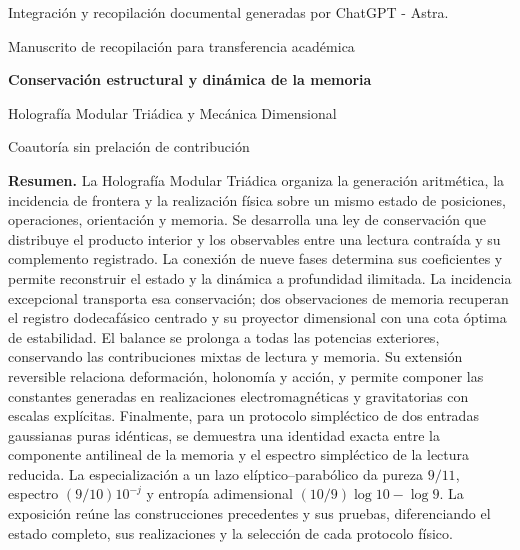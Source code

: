 \thispagestyle{plain}
\begin{center}
{\fontsize{8}{10}\selectfont Integración y recopilación documental generadas por ChatGPT - Astra.\par}
{\fontsize{9}{11}\selectfont Manuscrito de recopilación para transferencia académica\par}
\vspace{6mm}
{\fontsize{20}{24}\selectfont\bfseries Conservación estructural y dinámica de la memoria\par}
\vspace{3mm}
{\fontsize{12}{15}\selectfont Holografía Modular Triádica y Mecánica Dimensional\par}
\vspace{5mm}
{\fontsize{10}{12}\selectfont\Autores\par}
{\fontsize{8}{10}\selectfont Coautoría sin prelación de contribución\par}
\end{center}
\vspace{4mm}
\noindent\textbf{Resumen.}
La Holografía Modular Triádica organiza la generación aritmética, la incidencia de frontera y la realización física sobre un mismo estado de posiciones, operaciones, orientación y memoria. Se desarrolla una ley de conservación que distribuye el producto interior y los observables entre una lectura contraída y su complemento registrado. La conexión de nueve fases determina sus coeficientes y permite reconstruir el estado y la dinámica a profundidad ilimitada. La incidencia excepcional transporta esa conservación; dos observaciones de memoria recuperan el registro dodecafásico centrado y su proyector dimensional con una cota óptima de estabilidad. El balance se prolonga a todas las potencias exteriores, conservando las contribuciones mixtas de lectura y memoria. Su extensión reversible relaciona deformación, holonomía y acción, y permite componer las constantes generadas en realizaciones electromagnéticas y gravitatorias con escalas explícitas. Finalmente, para un protocolo simpléctico de dos entradas gaussianas puras idénticas, se demuestra una identidad exacta entre la componente antilineal de la memoria y el espectro simpléctico de la lectura reducida. La especialización a un lazo elíptico--parabólico da pureza \(9/11\), espectro \((9/10)10^{-j}\) y entropía adimensional \((10/9)\log10-\log9\). La exposición reúne las construcciones precedentes y sus pruebas, diferenciando el estado completo, sus realizaciones y la selección de cada protocolo físico.

